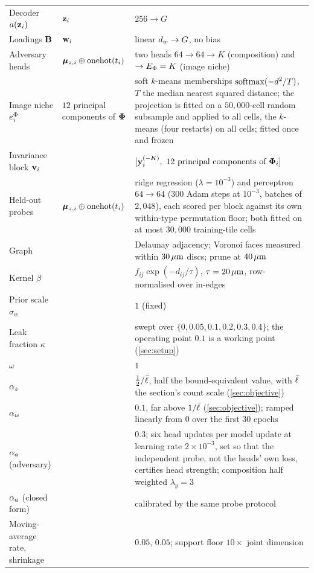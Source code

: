 \begin{table}[t]
\begin{tabular}{@{}p{}p{}p{}@{}}
Decoder $a(\mathbf{z}_i)$ & $\mathbf{z}_i$ & $256 \to G$ \\
Loadings $\mathbf{B}$ & $\mathbf{w}_i$ & linear $d_w \to G$, no bias \\
Adversary heads & $\boldsymbol{\mu}_{z,i} \oplus \operatorname{onehot}(t_i)$ & two heads $64 \to 64 \to K$ (composition) and $\to E_{\Phi} = K$ (image niche) \\
Image niche $e^{\Phi}_i$ & $12$ principal components of $\boldsymbol{\Phi}$ & soft $k$-means memberships $\operatorname{softmax}(-d^2/T)$, $T$ the median nearest squared distance; the projection is fitted on a $50{,}000$-cell random subsample and applied to all cells, the $k$-means (four restarts) on all cells; fitted once and frozen \\
Invariance block $\mathbf{v}_i$ & & $[\vy_i^{(-K)},\ 12 \text{ principal components of } \vPhi_i]$ \\
Held-out probes & $\boldsymbol{\mu}_{z,i} \oplus \operatorname{onehot}(t_i)$ & ridge regression ($\lambda = 10^{-3}$) and perceptron $64 \to 64$ ($300$ Adam steps at $10^{-3}$, batches of $2{,}048$), each scored per block against its own within-type permutation floor; both fitted on at most $30{,}000$ training-tile cells \\
\midrule
Graph & & Delaunay adjacency; Voronoi faces measured within $30\,\mu\text{m}$ discs; prune at $40\,\mu\text{m}$ \\
Kernel $\beta$ & & $f_{ij}\exp(-d_{ij}/\tau)$, $\tau = 20\,\mu\text{m}$, row-normalised over in-edges \\
Prior scale $\sigma_w$ & & $1$ (fixed) \\
\midrule
Leak fraction $\kappa$ & & swept over $\{0, 0.05, 0.1, 0.2, 0.3, 0.4\}$; the operating point $0.1$ is a working point (\cref{sec:setup}) \\
$\omega$ & & $1$ \\
$\alpha_z$ & & $\tfrac12/\bar{\ell}$, half the bound-equivalent value, with $\bar{\ell}$ the section's count scale (\cref{sec:objective}) \\
$\alpha_w$ & & $0.1$, far above $1/\bar{\ell}$ (\cref{sec:objective}); ramped linearly from $0$ over the first $30$ epochs \\
$\alpha_a$ (adversary) & & $0.3$; six head updates per model update at learning rate $2 \times 10^{-3}$, set so that the independent probe, not the heads' own loss, certifies head strength; composition half weighted $\lambda_y = 3$ \\
$\alpha_a$ (closed form) & & calibrated by the same probe protocol \\
Moving-average rate, shrinkage & & $0.05$, $0.05$; support floor $10\times$ joint dimension \\

\end{tabular}
\end{table}

